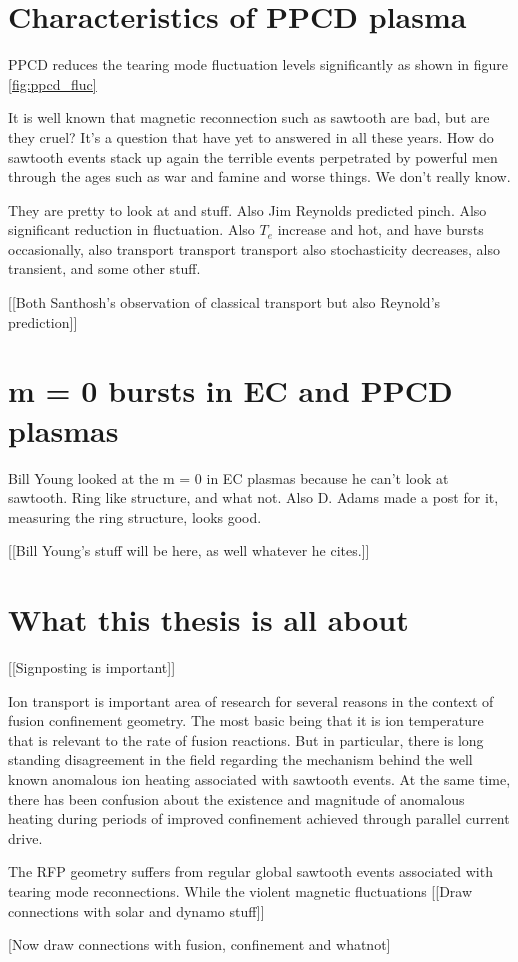 \begin{refsection}
\section{Characteristics of PPCD plasma}

PPCD reduces the tearing mode fluctuation levels significantly as shown in
figure \ref{fig:ppcd_fluc}


It is well known that magnetic reconnection such as sawtooth are bad, but are
they cruel? It's a question that have yet to answered in all these years. How
do sawtooth events stack up again the terrible events perpetrated by powerful
men through the ages such as war and famine and worse things. We don't really
know.



They are pretty to look at and stuff. Also Jim Reynolds predicted pinch. Also
significant reduction in fluctuation. Also $T_e$ increase and hot, and have
bursts occasionally, also transport transport transport also stochasticity
decreases, also transient, and some other stuff.


[[Both Santhosh's observation of classical transport but also Reynold's prediction]]


\section{m = 0 bursts in EC and PPCD plasmas}

Bill Young looked at the m = 0 in EC plasmas because he can't look at sawtooth.
Ring like structure, and what not. Also D. Adams made a post for it, measuring
the ring structure, looks good.


[[Bill Young's stuff will be here, as well whatever he cites.]]


\section{What this thesis is all about}
[[Signposting is important]]



Ion transport is important area of research for several reasons in the context
of fusion confinement geometry. The most basic being that it is ion temperature
that is relevant to the rate of fusion reactions. But in particular, there is
long standing disagreement in the field regarding the mechanism behind the well
known anomalous ion heating associated with sawtooth events. At the same time,
there has been confusion about the existence and magnitude of anomalous heating
during periods of improved confinement achieved through parallel current drive.

The RFP geometry suffers from regular global sawtooth events associated with
tearing mode reconnections. While the violent magnetic fluctuations [[Draw
connections with solar and dynamo stuff]]

[Now draw connections with fusion, confinement and whatnot]
\printbibliography%

\end{refsection}
